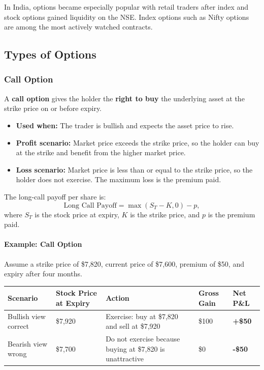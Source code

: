 \documentclass[12pt,openany]{book}
\begin{document}
In India, options became especially popular with retail traders after index and stock options gained liquidity on the NSE. Index options such as Nifty options are among the most actively watched contracts.

\subsection{Types of Options}

\subsubsection{Call Option}

A \textbf{call option} gives the holder the \textbf{right to buy} the underlying asset at the strike price on or before expiry.

\begin{itemize}[leftmargin=*]
    \item \textbf{Used when:} The trader is bullish and expects the asset price to rise.
    \item \textbf{Profit scenario:} Market price exceeds the strike price, so the holder can buy at the strike and benefit from the higher market price.
    \item \textbf{Loss scenario:} Market price is less than or equal to the strike price, so the holder does not exercise. The maximum loss is the premium paid.
\end{itemize}

The long-call payoff per share is:
\begin{equation*}
    \text{Long Call Payoff} = \max(S_T - K, 0) - p,
\end{equation*}
where \(S_T\) is the stock price at expiry, \(K\) is the strike price, and \(p\) is the premium paid.

\paragraph{Example: Call Option}
Assume a strike price of \$7,820, current price of \$7,600, premium of \$50, and expiry after four months.

\begin{center}
\scriptsize
\setlength{\tabcolsep}{3pt}
\begin{tabular}{|L{2.1cm}|L{2.25cm}|L{4.35cm}|L{1.8cm}|L{2.0cm}|}
\hline
\textbf{Scenario} & \textbf{Stock Price at Expiry} & \textbf{Action} & \textbf{Gross Gain} & \textbf{Net P\&L} \\
\hline
Bullish view correct & \$7,920 & Exercise: buy at \$7,820 and sell at \$7,920 & \$100 & \textbf{+\$50} \\
\hline
Bearish view wrong & \$7,700 & Do not exercise because buying at \$7,820 is unattractive & \$0 & \textbf{-\$50} \\
\hline
\end{tabular}
\end{center}
\end{document}
